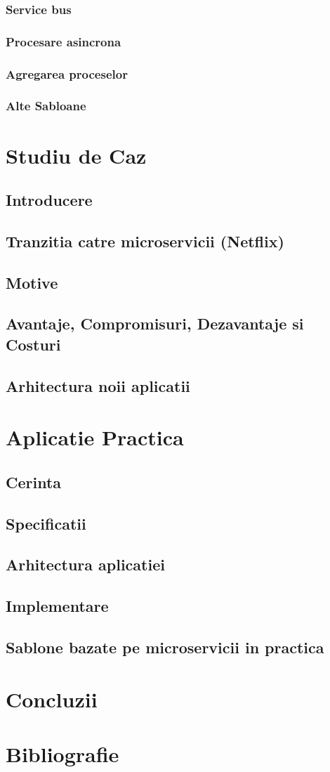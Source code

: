 \documentclass[12pt]{report}
\begin{document}
		\subsection{Service bus}
		\subsection{Procesare asincrona}
		\subsection{Agregarea proceselor}
		\subsection{Alte Sabloane}
\chapter{Studiu de Caz}
	\section{Introducere}
	\section{Tranzitia catre microservicii (Netflix)}
	\section{Motive}
	\section{Avantaje, Compromisuri, Dezavantaje si Costuri}
	\section{Arhitectura noii aplicatii}
	
\chapter{Aplicatie Practica}
	\section{Cerinta}
	\section{Specificatii}
	\section{Arhitectura aplicatiei}
	\section{Implementare}
	\section{Sablone bazate pe microservicii in practica}
\chapter{Concluzii}
\chapter{Bibliografie}
\end{document}

